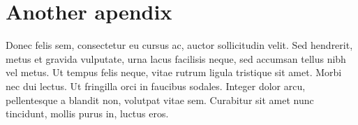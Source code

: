 \documentclass{UoYCSproject}
\begin{document}
\chapter{Another apendix}
Donec felis sem, consectetur eu cursus ac, auctor sollicitudin velit. Sed hendrerit, metus et gravida vulputate, urna lacus facilisis neque, sed accumsan tellus nibh vel metus. Ut tempus felis neque, vitae rutrum ligula tristique sit amet. Morbi nec dui lectus. Ut fringilla orci in faucibus sodales. Integer dolor arcu, pellentesque a blandit non, volutpat vitae sem. Curabitur sit amet nunc tincidunt, mollis purus in, luctus eros.


\printbibliography
\end{document}
